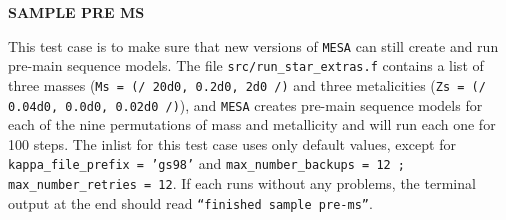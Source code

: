 \documentclass{article}
\begin{document}
	
	\begin{center}
		\begin{Large}
		       \textbf{SAMPLE PRE MS}\\
		\end{Large}
	\end{center}

        This test case is to make sure that new versions of \texttt{MESA} can still create and run pre-main sequence models.  The file \texttt{src/run\_star\_extras.f} contains a list of three masses (\texttt{Ms = (/ 20d0, 0.2d0, 2d0 /)} and three metalicities (\texttt{Zs = (/ 0.04d0, 0.0d0, 0.02d0 /)}), and \texttt{MESA} creates pre-main sequence models for each of the nine permutations of mass and metallicity and will run each one for 100 steps.  The inlist for this test case uses only default values, except for \texttt{kappa\_file\_prefix = 'gs98'} and \texttt{max\_number\_backups = 12 ; max\_number\_retries = 12}.  If each runs without any problems, the terminal output at the end should read \texttt{``finished sample pre-ms''}.\\
\end{document}
